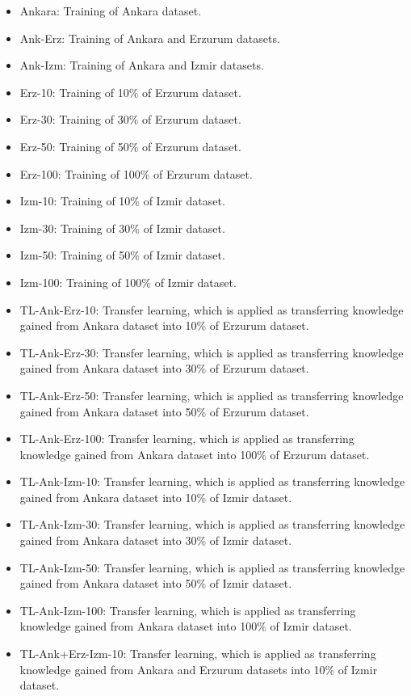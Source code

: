 \documentclass{article}
\begin{document}
\begin{itemize}
    \item Ankara: Training of Ankara dataset.
    \item Ank-Erz: Training of Ankara and Erzurum datasets.
    \item Ank-Izm: Training of Ankara and Izmir datasets.
    \item Erz-10: Training of 10\% of Erzurum dataset.
    \item Erz-30: Training of 30\% of Erzurum dataset.
    \item Erz-50: Training of 50\% of Erzurum dataset.
    \item Erz-100: Training of 100\% of Erzurum dataset.
    \item Izm-10: Training of 10\% of Izmir dataset.
    \item Izm-30: Training of 30\% of Izmir dataset.
    \item Izm-50: Training of 50\% of Izmir dataset.
    \item Izm-100: Training of 100\% of Izmir dataset.
    \item TL-Ank-Erz-10: Transfer learning, which is applied as transferring knowledge gained from Ankara dataset into 10\% of Erzurum dataset.
    \item TL-Ank-Erz-30: Transfer learning, which is applied as transferring knowledge gained from Ankara dataset into 30\% of Erzurum dataset.
    \item TL-Ank-Erz-50: Transfer learning, which is applied as transferring knowledge gained from Ankara dataset into 50\% of Erzurum dataset.
    \item TL-Ank-Erz-100: Transfer learning, which is applied as transferring knowledge gained from Ankara dataset into 100\% of Erzurum dataset.
    \item TL-Ank-Izm-10: Transfer learning, which is applied as transferring knowledge gained from Ankara dataset into 10\% of Izmir dataset.
    \item TL-Ank-Izm-30: Transfer learning, which is applied as transferring knowledge gained from Ankara dataset into 30\% of Izmir dataset.
    \item TL-Ank-Izm-50: Transfer learning, which is applied as transferring knowledge gained from Ankara dataset into 50\% of Izmir dataset.
    \item TL-Ank-Izm-100: Transfer learning, which is applied as transferring knowledge gained from Ankara dataset into 100\% of Izmir dataset.
    \item TL-Ank+Erz-Izm-10: Transfer learning, which is applied as transferring knowledge gained from Ankara and Erzurum datasets into 10\% of Izmir dataset.

\end{itemize}
\end{document}
